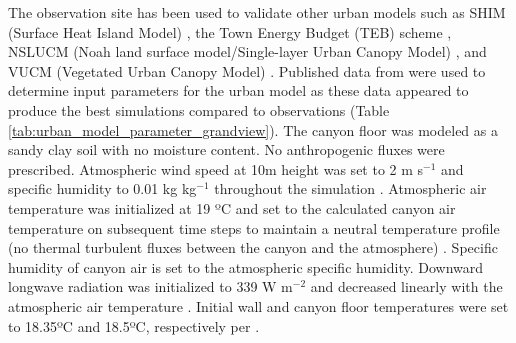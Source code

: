 \documentclass[12pt,authoryear]{elsarticle}
\numberwithin{equation}{section} %
\begin{document}
The observation site has been used to validate other urban models such as SHIM
(Surface Heat Island Model) \citep{johnsonSimulationSurfaceUrban1991}, the Town Energy Budget (TEB) scheme \citep{massonPhysicallyBasedSchemeUrban2000}, NSLUCM (Noah land surface model/Single-layer Urban Canopy Model) \citep{kusakaSimpleSingleLayerUrban2001}, and VUCM (Vegetated Urban Canopy Model) \citep{leeVegetatedUrbanCanopy2008}. Published data from \cite{leeVegetatedUrbanCanopy2008} were used to determine input
parameters for the urban model as these data appeared to produce the best simulations compared to observations (Table \ref{tab:urban_model_parameter_grandview}). The canyon floor was modeled as a sandy clay soil with no moisture content. No anthropogenic fluxes were prescribed. Atmospheric wind speed at 10m height was set to 2 m s$^{-1}$ and specific humidity to 0.01 kg kg$^{-1}$ throughout the simulation \cite{leeVegetatedUrbanCanopy2008}. Atmospheric air temperature was initialized at 19 ºC and set to the calculated canyon air temperature on subsequent time steps to maintain a neutral temperature profile (no thermal turbulent fluxes between the canyon and the atmosphere) \citep{massonPhysicallyBasedSchemeUrban2000}. Specific humidity of canyon air is set to the atmospheric specific humidity. Downward longwave radiation was initialized to 339 W m$^{-2}$ and decreased linearly with the atmospheric air temperature \citep{massonPhysicallyBasedSchemeUrban2000}. Initial wall and canyon floor temperatures were set to 18.35ºC and 18.5ºC, respectively per
\cite{johnsonSimulationSurfaceUrban1991}.
\end{document}
